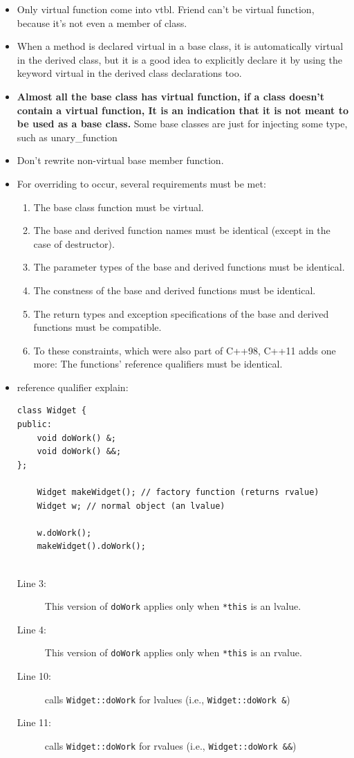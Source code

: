 \documentclass[a4paper,11pt,twoside]{book}
\begin{document}
\begin{itemize}
	
	\item Only virtual function come into vtbl. Friend can't be virtual function, because it's not even a member of class.
	
	\item When a method is declared virtual in a base class, it is automatically virtual in the derived class, but it is a good idea to explicitly declare it by using the keyword virtual in the derived class declarations too.
	
	\item \textbf{Almost all the base class has virtual function, if a class doesn't contain a virtual function, It is an indication that it is not meant to be used as a base class.} Some base classes are just for injecting some type, such as unary\_function 
	
	\item Don't rewrite non-virtual base member function.
	
	\item For overriding to occur, several requirements must be met:
	\begin{enumerate}
		\item The base class function must be virtual.
		\item The base and derived function names must be identical (except in the case of
		destructor).
		\item The parameter types of the base and derived functions must be identical.
		\item The constness of the base and derived functions must be identical.
		\item The return types and exception specifications of the base and derived functions
		must be compatible.
		\item To these constraints, which were also part of C++98, C++11 adds one more: The functions' reference qualifiers must be identical.
	\end{enumerate}
	\item reference qualifier explain:
\begin{lstlisting}
class Widget {
public:
	void doWork() &; 
	void doWork() &&; 
}; 
	
	Widget makeWidget(); // factory function (returns rvalue)
	Widget w; // normal object (an lvalue)
	
	w.doWork();
	makeWidget().doWork();
	
\end{lstlisting}
\begin{description}
	\item[Line 3:] This version of \texttt{doWork} applies only when \texttt{*this} is an lvalue.
	\item[Line 4:] This version of \texttt{doWork} applies only when \texttt{*this} is an rvalue.
	\item[Line 10:] calls \texttt{Widget::doWork} for lvalues (i.e., \texttt{Widget::doWork \&})
	\item[Line 11:] calls \texttt{Widget::doWork} for rvalues (i.e., \texttt{Widget::doWork \&\&})
\end{description}
	

\end{itemize}
\end{document}
